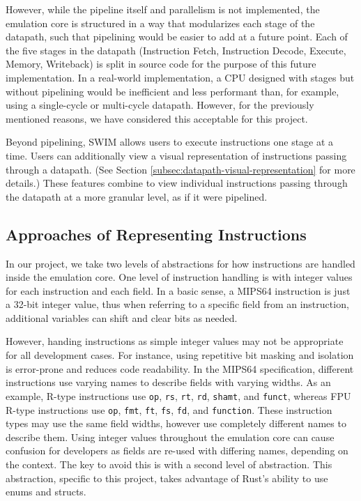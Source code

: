 \documentclass[
    paper=letter,
    parskip=half,
    fontsize=12pt,
    titlepage=firstiscover,
    toc=bibliography,
    numbers=endperiod
]{scrartcl}
\begin{document}
However, while the pipeline itself and parallelism is not implemented,
the emulation core is structured in a way that modularizes each stage of
the datapath, such that pipelining would be easier to add at a future
point. Each of the five stages in the datapath (Instruction Fetch,
Instruction Decode, Execute, Memory, Writeback) is split in source code
for the purpose of this future implementation. In a real-world
implementation, a CPU designed with stages but without pipelining would
be inefficient and less performant than, for example, using a
single-cycle or multi-cycle datapath. However, for the previously
mentioned reasons, we have considered this acceptable for this project.

Beyond pipelining, SWIM allows users to execute instructions one stage
at a time. Users can additionally view a visual representation of
instructions passing through a datapath. (See Section
\ref{subsec:datapath-visual-representation} for more details.) These
features combine to view individual instructions passing through the
datapath at a more granular level, as if it were pipelined.

\subsection{Approaches of Representing Instructions}

In our project, we take two levels of abstractions for how instructions
are handled inside the emulation core. One level of instruction handling
is with integer values for each instruction and each field. In a basic
sense, a MIPS64 instruction is just a 32-bit integer value, thus when
referring to a specific field from an instruction, additional variables
can shift and clear bits as needed.

However, handing instructions as simple integer values may not be
appropriate for all development cases. For instance, using repetitive
bit masking and isolation is error-prone and reduces code readability.
In the MIPS64 specification, different instructions use varying names to
describe fields with varying widths. As an example, R-type instructions
use \texttt{op}, \texttt{rs}, \texttt{rt}, \texttt{rd}, \texttt{shamt},
and \texttt{funct}, whereas FPU R-type instructions use \texttt{op},
\texttt{fmt}, \texttt{ft}, \texttt{fs}, \texttt{fd}, and
\texttt{function}. These instruction types may use the same field
widths, however use completely different names to describe them. Using
integer values throughout the emulation core can cause confusion for
developers as fields are re-used with differing names, depending on the
context. The key to avoid this is with a second level of abstraction.
This abstraction, specific to this project, takes advantage of Rust's
ability to use enums and structs.
\end{document}
